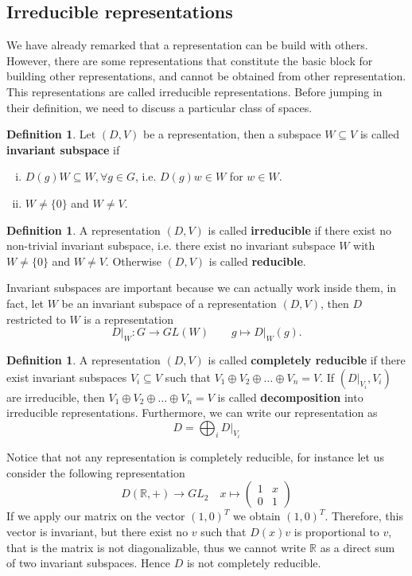 \documentclass[12pt]{book}
\theoremstyle{plain}
\newcommand{\R}{\mathbb{R}}
\theoremstyle{definition}
\newtheorem{dfn}[thm]{Definition}
\theoremstyle{remark}
\begin{document}
\subsection{Irreducible representations}
We have already remarked that a representation can be build with others. However, there are some representations that constitute the basic block for building other representations, and cannot be obtained from other representation. This representations are called irreducible representations. Before jumping in their definition, we need to discuss a particular class of spaces.
\begin{dfn}
Let $(D,V)$ be a representation, then a subspace $W\subseteq V$ is called \textbf{invariant subspace} if
\begin{enumerate}[i.]
	\item $D(g)W\subseteq W, \forall g\in G$, i.e. $D(g)w\in W$ for $w\in W$.
	\item $W\neq \{0\}$ and $W\neq V$.
\end{enumerate}
\end{dfn}
\begin{dfn}
A representation $(D,V)$ is called \textbf{irreducible} if there exist no non-trivial invariant subspace, i.e. there exist no invariant subspace $W$ with $W\neq\{0\}$ and $W\neq V$. Otherwise $(D,V)$ is called \textbf{reducible}.
\end{dfn}
Invariant subspaces are important because we can actually work inside them, in fact, let $W$ be an invariant subspace of a representation $(D,V)$, then $D$ restricted to $W$ is a representation
\[D\big|_W:G\to GL(W)\qquad g\mapsto D\big|_W(g).\]
\begin{dfn}
A representation $(D,V)$ is called \textbf{completely reducible} if there exist invariant subspaces $V_i\subseteq V$ such that $V_1\oplus V_2\oplus\dots\oplus V_n = V$. If  $(D\big|_{V_i},V_i)$ are irreducible, then $V_1\oplus V_2\oplus\dots\oplus V_n = V$ is called \textbf{decomposition} into irreducible representations. Furthermore, we can write our representation as
\[D = \bigoplus_{i}D\big|_{V_i}\]
\end{dfn}
Notice that not any representation is completely reducible, for instance let us consider the following representation
\[D(\R,+)\to GL_2\quad x\mapsto \begin{pmatrix}
  1 & x\\
  0 & 1 
 \end{pmatrix} \]
If we apply our matrix on the vector $(1,0)^{T}$ we obtain $(1,0)^{T}$. Therefore, this vector is invariant, but there exist no $v$ such that $D(x)v$ is proportional to $v$, that is the matrix is not diagonalizable, thus we cannot write $\R$ as a direct sum of two invariant subspaces. Hence $D$ is not completely reducible.\\
\end{document}
